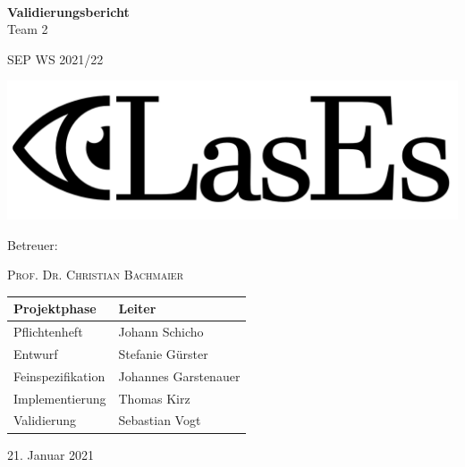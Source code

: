 \documentclass[a4paper,11pt]{article}
\begin{document}
    \begin{titlepage}
        \centering

        $~$

        \vspace{0.2cm} %

        \Huge \textbf{Validierungsbericht}\\

        \Huge Team 2
        \Large

        SEP WS 2021/22

        \vspace{2cm}

        \includegraphics[width=0.8\linewidth]{graphics/LasEs-logo}

        \vspace{2cm}

        Betreuer:

        \textsc{Prof. Dr. Christian Bachmaier}

        \vspace{1cm}

        \begin{table}[H]
            \centering
            \Large
            \begin{tabular}{ll}
                \toprule
                \textbf{Projektphase} & \textbf{Leiter} \\
                \midrule
                Pflichtenheft & Johann Schicho \\
                Entwurf & Stefanie Gürster \\
                Feinspezifikation & Johannes Garstenauer \\
                Implementierung & Thomas Kirz \\
                Validierung & Sebastian Vogt \\
                \bottomrule
            \end{tabular}
        \end{table}

        \vspace{1cm}

        21. Januar 2021

    \end{titlepage}
\end{document}
